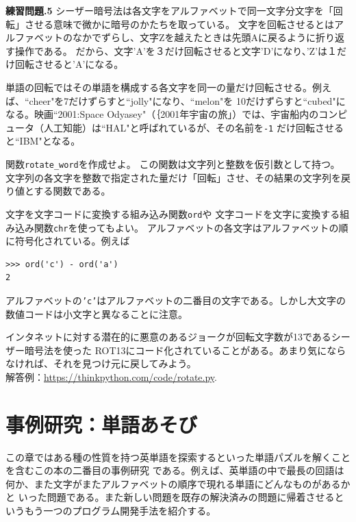 \documentclass[a4j,12pt,makeidx]{jbook}
\newcommand{\tp}{\thechapter}
\begin{document}
\noindent
{\bf 練習問題\tp.5} シーザー暗号法は各文字をアルファベットで同一文字分文字を「回転」させる意味で微かに暗号のかたちを取っている。
文字を回転させるとはアルファベットのなかでずらし、文字Zを越えたときは先頭Aに戻るように折り返す操作である。
だから、文字'A'を３だけ回転させると文字'D'になり、'Z'は１だけ回転させると'A'になる。\par
単語の回転ではその単語を構成する各文字を同一の量だけ回転させる。例えば、``cheer"を7だけずらすと``jolly"になり、``melon"を
10だけずらすと``cubed"になる。映画``2001:Space Odyasey"（｛2001年宇宙の旅」）では、宇宙船内のコンピュータ（人工知能）は``HAL"と呼ばれているが、その名前を{\tt -1}
だけ回転させると``IBM"となる。

関数{\tt rotate\_word}を作成せよ。
この関数は文字列と整数を仮引数として持つ。
文字列の各文字を整数で指定された量だけ「回転」させ、その結果の文字列を戻り値とする関数である。\par
文字を文字コードに変換する組み込み関数{\tt ord}や
文字コードを文字に変換する組み込み関数{\tt chr}を使ってもよい。 
アルファベットの各文字はアルファベットの順に符号化されている。例えば
\begin{verbatim}
>>> ord('c') - ord('a')
2
\end{verbatim}
アルファベットの{\tt 'c'}はアルファベットの二番目の文字である。しかし大文字の数値コードは小文字と異なることに注意。\par
インタネットに対する潜在的に悪意のあるジョークが回転文字数が13であるシーザー暗号法を使った
ROT13にコード化されていることがある。あまり気にならなければ、それを見つけ元に戻してみよう。\\
解答例：\url{https://thinkpython.com/code/rotate.py}.
%
\chapter{事例研究：単語あそび}
この章ではある種の性質を持つ英単語を探索するといった単語パズルを解くことを含むこの本の二番目の事例研究
である。例えば、英単語の中で最長の回語は何か、また文字がまたアルファベットの順序で現れる単語にどんなものがあるかと
いった問題である。また新しい問題を既存の解決済みの問題に帰着させるというもう一つのプログラム開発手法を紹介する。
\end{document}
